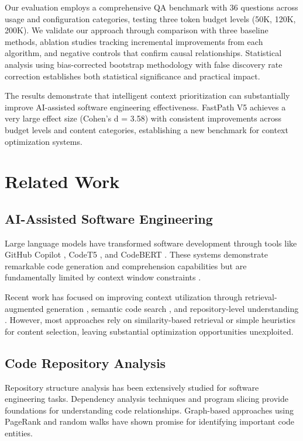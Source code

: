 \documentclass[conference]{IEEEtran}
\begin{document}
Our evaluation employs a comprehensive QA benchmark with 36 questions across usage and configuration categories, testing three token budget levels (50K, 120K, 200K). We validate our approach through comparison with three baseline methods, ablation studies tracking incremental improvements from each algorithm, and negative controls that confirm causal relationships. Statistical analysis using bias-corrected bootstrap methodology with false discovery rate correction establishes both statistical significance and practical impact.

The results demonstrate that intelligent context prioritization can substantially improve AI-assisted software engineering effectiveness. FastPath V5 achieves a very large effect size (Cohen's d = 3.58) with consistent improvements across budget levels and content categories, establishing a new benchmark for context optimization systems.

\section{Related Work}

\subsection{AI-Assisted Software Engineering}
Large language models have transformed software development through tools like GitHub Copilot \cite{github_copilot}, CodeT5 \cite{wang2021codet5}, and CodeBERT \cite{feng2020codebert}. These systems demonstrate remarkable code generation and comprehension capabilities but are fundamentally limited by context window constraints \cite{kocetkov2022stack}.

Recent work has focused on improving context utilization through retrieval-augmented generation \cite{lewis2020retrieval}, semantic code search \cite{husain2019codesearchnet}, and repository-level understanding \cite{fried2023incoder}. However, most approaches rely on similarity-based retrieval or simple heuristics for content selection, leaving substantial optimization opportunities unexploited.

\subsection{Code Repository Analysis}
Repository structure analysis has been extensively studied for software engineering tasks. Dependency analysis techniques \cite{sangal2005using} and program slicing \cite{weiser1981program} provide foundations for understanding code relationships. Graph-based approaches using PageRank \cite{page1999pagerank} and random walks \cite{lovász1993random} have shown promise for identifying important code entities.
\end{document}
